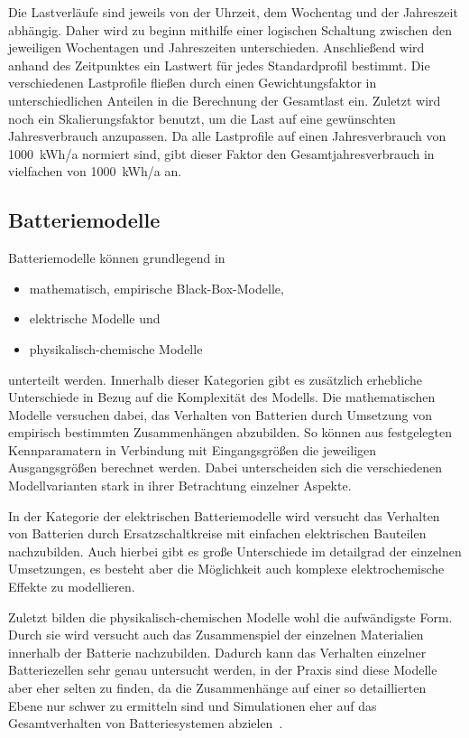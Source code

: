 Die Lastverläufe sind jeweils von der Uhrzeit, dem Wochentag und der Jahreszeit abhängig. Daher wird zu beginn mithilfe einer logischen Schaltung zwischen den jeweiligen Wochentagen und Jahreszeiten unterschieden. Anschließend wird anhand des Zeitpunktes ein Lastwert für jedes Standardprofil bestimmt. Die verschiedenen Lastprofile fließen durch einen Gewichtungsfaktor in unterschiedlichen Anteilen in die Berechnung der Gesamtlast ein. Zuletzt wird noch ein Skalierungsfaktor benutzt, um die Last auf eine gewünschten Jahresverbrauch anzupassen. Da alle Lastprofile auf einen Jahresverbrauch von 1000~kWh/a normiert sind, gibt dieser Faktor den Gesamtjahresverbrauch in vielfachen von 1000~kWh/a an.
\subsection{Batteriemodelle}\label{Batteriemodelle}
Batteriemodelle können grundlegend in 
\begin{itemize}
    \item mathematisch, empirische Black-Box-Modelle,
    \item elektrische Modelle und
   \item physikalisch-chemische Modelle
\end{itemize}
unterteilt werden. 
Innerhalb dieser Kategorien gibt es zusätzlich erhebliche Unterschiede in Bezug auf die Komplexität des Modells.
Die mathematischen Modelle versuchen dabei, das Verhalten von Batterien durch Umsetzung von empirisch bestimmten
Zusammenhängen abzubilden.
So können aus festgelegten Kennparamatern in Verbindung mit Eingangsgrößen die jeweiligen Ausgangsgrößen berechnet werden.
Dabei unterscheiden sich die verschiedenen Modellvarianten stark in ihrer Betrachtung einzelner Aspekte.

In der Kategorie der elektrischen Batteriemodelle wird versucht das Verhalten von Batterien durch Ersatzschaltkreise
mit einfachen elektrischen Bauteilen nachzubilden.
Auch hierbei gibt es große Unterschiede im detailgrad der einzelnen Umsetzungen, es besteht aber die Möglichkeit
auch komplexe elektrochemische Effekte zu modellieren.

Zuletzt bilden die physikalisch-chemischen Modelle wohl die aufwändigste Form.
Durch sie wird versucht auch das Zusammenspiel der einzelnen Materialien innerhalb der Batterie nachzubilden.
Dadurch kann das Verhalten einzelner Batteriezellen sehr genau untersucht werden, in der Praxis sind diese
Modelle aber eher selten zu finden, da die Zusammenhänge auf einer so detaillierten Ebene nur schwer zu ermitteln sind
und Simulationen eher auf das Gesamtverhalten von Batteriesystemen abzielen~\parencite[]{keil2012aufbau}.

